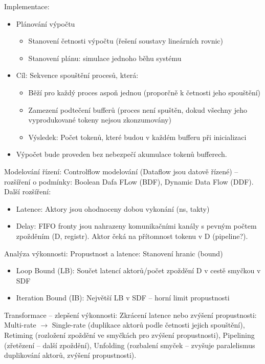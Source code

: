 \documentclass[a4paper, 11pt]{report}
\begin{document}
Implementace:
\begin{itemize}
	\item Plánování výpočtu
	\begin{itemize}
		\item Stanovení četnosti výpočtu (řešení soustavy lineárních rovnic)
		\item Stanovení plánu: simulace jednoho běhu systému
	\end{itemize}
	\item Cíl: Sekvence spouštění procesů, která:
	\begin{itemize}
		\item Běží pro každý proces aspoň jednou (proporčně k četnosti jeho spouštění)
		\item Zamezení podtečení bufferů (proces není spuštěn, dokud všechny jeho vyprodukované tokeny nejsou zkonzumovány)
		\item Výsledek: Počet tokenů, které budou v každém bufferu při inicializaci
	\end{itemize}
	\item Výpočet bude proveden bez nebezpečí akumulace tokenů bufferech.
\end{itemize}

Modelování řízení: Controlflow modelování (Dataflow jsou datově řízené) -- rozšíření o podmínky: Boolean Dafa FLow (BDF), Dynamic Data Flow (DDF). Další rozšíření:
\begin{itemize}
	\item Latence: Aktory jsou ohodnoceny dobou vykonání (ns, takty)
	\item Delay: FIFO fronty jsou nahrazeny komunikačními kanály s pevným počtem zpožděním (D, registr). Aktor čeká na přítomnost tokenu v D (pipeline?).
\end{itemize}

Analýza výkonnosti: Propustnost a latence: Stanovení hranic (bound)
\begin{itemize}
	\item Loop Bound (LB): Součet latencí aktorů/počet zpoždění D v cestě smyčkou v SDF
	\item Iteration Bound (IB): Největší LB v SDF -- horní limit propustnosti
\end{itemize}


Transformace -- zlepšení výkonnosti: Zkrácení latence nebo zvýšení propustnosti: Multi-rate $\to$ Single-rate (duplikace aktorů podle četnosti jejich spouštění), Retiming (rozložení zpoždění ve smyčkách pro zvýšení propustnosti), Pipelining (zřetězení -- další zpoždění), Unfolding (rozbalení smyček -- zvyšuje paralelismus duplikování aktorů, zvýšení propustnosti).
\end{document}
